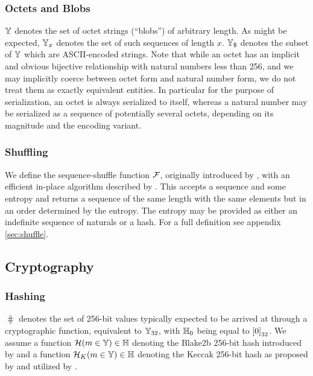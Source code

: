 \subsubsection{Octets and Blobs}

$\mathbb{Y}$ denotes the set of octet strings (``blobs'') of arbitrary length. As might be expected, $\mathbb{Y}_{x}$ denotes the set of such sequences of length $x$. $\mathbb{Y}_{\$}$ denotes the subset of $\mathbb{Y}$ which are ASCII-encoded strings. Note that while an octet has an implicit and obvious bijective relationship with natural numbers less than 256, and we may implicitly coerce between octet form and natural number form, we do not treat them as exactly equivalent entities. In particular for the purpose of serialization, an octet is always serialized to itself, whereas a natural number may be serialized as a sequence of potentially several octets, depending on its magnitude and the encoding variant.

\subsubsection{Shuffling}

We define the sequence-shuffle function $\mathcal{F}$, originally introduced by \cite{fisheryates1938statistical}, with an efficient in-place algorithm described by \cite{wikipedia2024fisheryates}. This accepts a sequence and some entropy and returns a sequence of the same length with the same elements but in an order determined by the entropy. The entropy may be provided as either an indefinite sequence of naturals or a hash. For a full definition see appendix \ref{sec:shuffle}.

\subsection{Cryptography}\label{sec:cryptography}

\subsubsection{Hashing}

$\hash$ denotes the set of 256-bit values typically expected to be arrived at through a cryptographic function, equivalent to $\mathbb{Y}_{32}$, with $\mathbb{H}_0$ being equal to $\sq{0}_{32}$. We assume a function $\blake{m \in \blob} \in \hash$ denoting the Blake2b 256-bit hash introduced by \cite{rfc7693} and a function $\keccak{m \in \blob} \in \hash$ denoting the Keccak 256-bit hash as proposed by \cite{bertoni2013keccak} and utilized by \cite{wood2014ethereum}.

